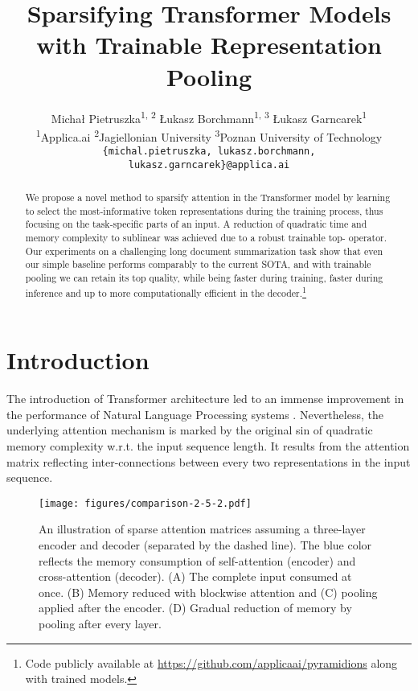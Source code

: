 \documentclass{article}
\title{Sparsifying Transformer Models with Trainable Representation Pooling}
\author{Michał Pietruszka\textsuperscript{1, 2} \quad Łukasz Borchmann\textsuperscript{1, 3} \quad Łukasz Garncarek\textsuperscript{1} \\
  \textsuperscript{1}Applica.ai \quad \textsuperscript{2}Jagiellonian University \quad \textsuperscript{3}Poznan University of Technology \\
  \texttt{\{michal.pietruszka, lukasz.borchmann,}\\ \texttt{lukasz.garncarek\}@applica.ai} \\
}
\begin{document}
\maketitle

\begin{abstract}
We propose a novel method to sparsify attention in the Transformer model by learning to select the most-informative token representations during the training process, thus focusing on the task-specific parts of an input. 
A reduction of quadratic time and memory complexity to sublinear was achieved due to a robust trainable top- operator.
Our experiments on a challenging long document summarization task show that even our simple baseline performs comparably to the current SOTA, and with trainable pooling we can retain its top quality, while being  faster during training,  faster during inference and up to  more computationally efficient in the decoder.\footnote{Code publicly available at \url{https://github.com/applicaai/pyramidions} along with trained models.}
\end{abstract}


\section{Introduction}  

The introduction of Transformer architecture led to an immense improvement in the performance of Natural Language Processing systems \citep{Vaswani2017AttentionIA,Radford2018ImprovingLU,Devlin2019BERTPO}. Nevertheless, the underlying attention mechanism is marked by the original sin of quadratic memory complexity w.r.t. the input sequence length. It results from the attention matrix reflecting inter-connections between every two representations in the input sequence.

\begin{figure}
    \centering
        \texttt{[image: figures/comparison-2-5-2.pdf]}
        \caption{
        An illustration of sparse attention matrices assuming a three-layer encoder and decoder (separated by the dashed line). The blue color reflects the memory consumption of self-attention (encoder) and cross-attention (decoder).
        (A) The complete input consumed at once. 
        (B) Memory reduced with blockwise attention and (C) pooling applied after the encoder. (D) Gradual reduction of memory by pooling after every layer.}
        \label{fig:comparison}
\end{figure}
\end{document}
